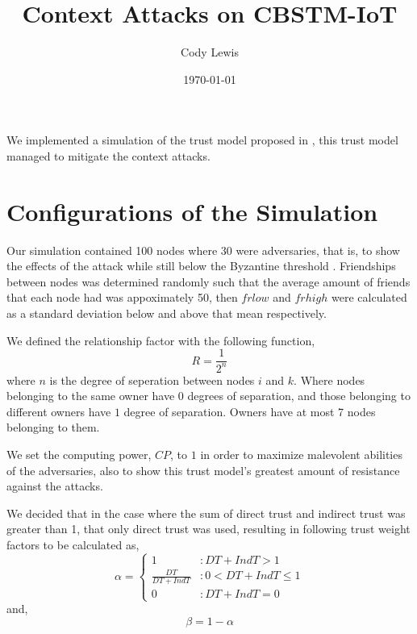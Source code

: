 \documentclass{article}
\title{Context Attacks on CBSTM-IoT}
\author{Cody Lewis}
\date{\today}
\begin{document}
    \maketitle

    We implemented a simulation of the trust model proposed in \cite{rafey2016cbstm},
    this trust model managed to mitigate the context attacks.

    \section{Configurations of the Simulation}
    Our simulation contained 100 nodes where 30 were adversaries, that is, to
    show the effects of the attack while still below the Byzantine threshold
    \cite{lamport2019byzantine}. Friendships between nodes was determined
    randomly such that the average amount of friends that each node had was
    appoximately 50, then $frlow$ and $frhigh$ were calculated as a standard
    deviation below and above that mean respectively.

    We defined the relationship factor with the following function,
    \begin{equation}
        R = \frac{1}{2^n}
    \end{equation}
    where $n$ is the degree of seperation between nodes $i$ and $k$. Where
    nodes belonging to the same owner have $0$ degrees of separation, and
    those belonging to different owners have $1$ degree of separation.
    Owners have at most 7 nodes belonging to them.

    We set the computing power, $CP$, to $1$ in order to maximize malevolent abilities of
    the adversaries, also to show this trust model's greatest amount of resistance
    against the attacks.

    We decided that in the case where the sum of direct trust and indirect trust was greater
    than 1, that only direct trust was used, resulting in following trust weight factors
    to be calculated as,
    \begin{equation}
        \alpha = \begin{cases}
            1 & : DT + IndT > 1 \\
            \frac{DT}{DT + IndT} & : 0 < DT + IndT \leq 1 \\
            0 & : DT + IndT = 0
        \end{cases}
    \end{equation}
    and,
    \begin{equation}
        \beta = 1 - \alpha
    \end{equation}
\end{document}
